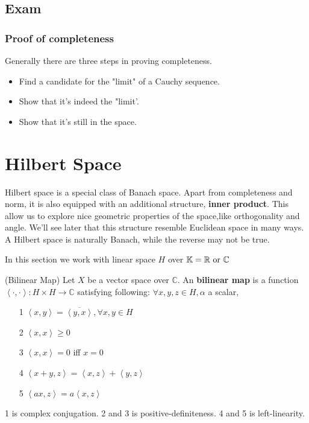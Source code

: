 \documentclass{article}
\begin{document}
\subsection{Exam}
\subsubsection{Proof of completeness}
Generally there are three steps in proving completeness.
\begin{itemize}
	\item Find a candidate for the "limit" of a Cauchy sequence.
	\item Show that it's indeed the "limit'.
	\item Show that it's still in the space.
\end{itemize}

\newpage
\section{Hilbert Space}  

\begin{unexaminable}
Hilbert space is a special class of Banach space. Apart from completeness and norm, it is also equipped with an additional structure, {\bf inner product}. This allow us to explore nice geometric properties of the space,like orthogonality and angle. We'll see later that this structure resemble Euclidean space in many ways. A Hilbert space is naturally Banach, while the reverse may not be true.
\end{unexaminable}

In this section we work with linear space $H$ over $\mathbb{K} = \real \ \textrm{or} \ \mathbb{ C}$

\begin{definition}
(Bilinear Map)
	Let $X$ be a vector space over $\mathbb C$. An {\bf bilinear map} is a function $\left<\cdot,\cdot\right>:H \times H \xrightarrow{}{\mathbb C}$ satisfying following: $\forall x,y,z\in H,\alpha$ a scalar,
	\begin{itemize}
		\item[1] $\left<x,y\right>={\overline{\left<y,x\right>}},\forall x,y\in H$
		\item[2] $\left<x,x\right>\geq0$
		\item[3] $\left<x,x\right>=0$ iff $x=0$
		\item[4] $\left<x+y,z\right>=\left<x,z\right>+\left<y,z\right>$
		\item[5] $\left<ax,z\right>=a\left<x,z\right>$
	\end{itemize}
\end{definition}
1 is complex conjugation. 2 and 3 is positive-definiteness. 4 and 5 is left-linearity.
\end{document}
